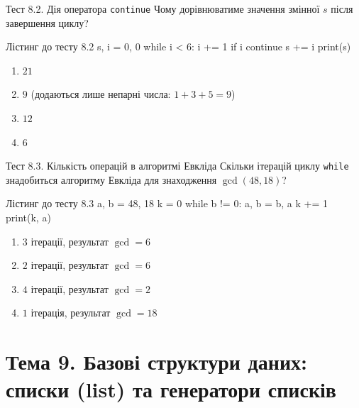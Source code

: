 \begin{pr}{Тест 8.2. Дія оператора \texttt{continue}}
Чому дорівнюватиме значення змінної $s$ після завершення циклу?
\begin{py}{Лістинг до тесту 8.2}
s, i = 0, 0
while i < 6:
    i += 1
    if i %
        continue
    s += i
print(s)
\end{py}
\begin{enumerate}[label=\textbf{\Alph*.}]
	\item $21$
	\item $9$ (додаються лише непарні числа: $1 + 3 + 5 = 9$)
	\item $12$
	\item $6$
\end{enumerate}
\end{pr}

\begin{pr}{Тест 8.3. Кількість операцій в алгоритмі Евкліда}
Скільки ітерацій циклу \texttt{while} знадобиться алгоритму Евкліда для знаходження $\gcd(48, 18)$?
\begin{py}{Лістинг до тесту 8.3}
a, b = 48, 18
k = 0
while b != 0:
    a, b = b, a %
    k += 1
print(k, a)
\end{py}
\begin{enumerate}[label=\textbf{\Alph*.}]
	\item $3$ ітерації, результат $\gcd = 6$
	\item $2$ ітерації, результат $\gcd = 6$
	\item $4$ ітерації, результат $\gcd = 2$
	\item $1$ ітерація, результат $\gcd = 18$
\end{enumerate}
\end{pr}

\section{Тема 9. Базові структури даних: списки (list) та генератори списків}

